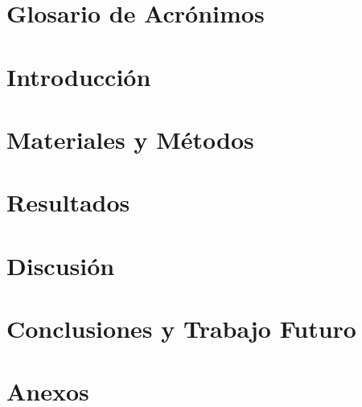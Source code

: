 \documentclass[a4paper,12pt]{article}
\begin{document}
\clearpage
{}
\listoftables

\clearpage
\section*{Glosario de Acrónimos}


\clearpage
{}

\section{Introducción}


\clearpage
\section{Materiales y Métodos}


\clearpage
\section{Resultados}


\clearpage
\section{Discusión}


\clearpage
\section{Conclusiones y Trabajo Futuro}


\clearpage
{}


\clearpage
\section*{Anexos}

\end{document}
